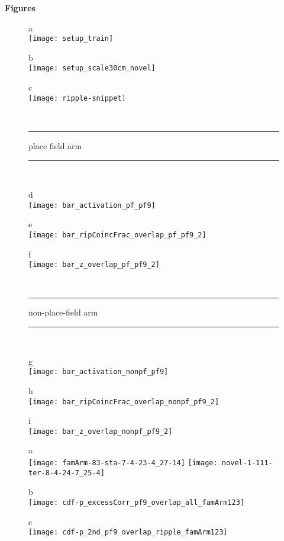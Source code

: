 \documentclass[11pt]{article}
\begin{document}
{\Large\bf Figures} %




\begin{figure}[htbp]
    \parbox[t]{6.3in} {
    \parbox[t]{1.5in} { {\sf a} \\
        \texttt{[image: setup\_train]}
    } 
    \parbox[t]{1.5in} { {\sf b} \\
        \texttt{[image: setup\_scale30cm\_novel]}
    }
    \parbox[t]{1.5in} { {\sf c} \\
        \texttt{[image: ripple-snippet]}
    }
    \\ \vskip 12pt
    \parbox[t]{4.4in} {
        \rule{1.5in}{1pt} \hfill
        {\sf place field arm }
        \hfill \rule{1.5in}{1pt} \\
        \parbox[t]{1.4in} { {\sf d}\\
            \texttt{[image: bar\_activation\_pf\_pf9]} 
        } \hfill
        \parbox[t]{1.4in} { {\sf e}\\
            \texttt{[image: bar\_ripCoincFrac\_overlap\_pf\_pf9\_2]} \hfill
        } \hfill
        \parbox[t]{1.4in} { {\sf f}\\
            \texttt{[image: bar\_z\_overlap\_pf\_pf9\_2]}
        } \hfill
    } \\
    \parbox[t]{4.4in} {
        \rule{1.4in}{1pt} \hfill
        {\sf non-place-field arm }
        \hfill \rule{1.4in}{1pt} \\
        \parbox[t]{1.4in} { {\sf g}\\
            \texttt{[image: bar\_activation\_nonpf\_pf9]} 
        } \hfill
        \parbox[t]{1.4in} { {\sf h}\\
            \texttt{[image: bar\_ripCoincFrac\_overlap\_nonpf\_pf9\_2]} \hfill
        } \hfill
        \parbox[t]{1.4in} { {\sf i}\\
            \texttt{[image: bar\_z\_overlap\_nonpf\_pf9\_2]}
        } \hfill
    }
    }
    \caption{ } %
\end{figure}


\begin{figure}[htbp]
    \parbox[t]{1.5in} { {\sf a} \\
        \texttt{[image: famArm-83-sta-7-4-23-4\_27-14]}
\vskip-6.1mm
        \texttt{[image: novel-1-111-ter-8-4-24-7\_25-4]}
    }
    \parbox[t]{2.5in} { {\sf b} \\
        \texttt{[image: cdf-p\_excessCorr\_pf9\_overlap\_all\_famArm123]}
    }
    \parbox[t]{2.5in} { {\sf c} \\
    \texttt{[image: cdf-p\_2nd\_pf9\_overlap\_ripple\_famArm123]}
    }
    \caption{ } %
\end{figure}
\end{document}
